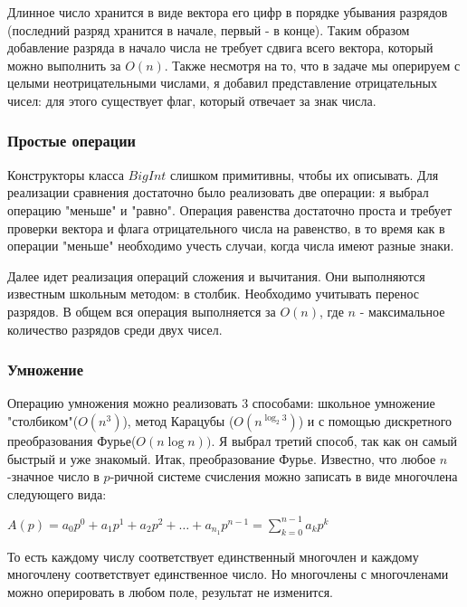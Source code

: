 \documentclass[12pt]{article}
\begin{document}
	Длинное число хранится в виде вектора его цифр в порядке убывания разрядов (последний разряд хранится в начале, первый - в конце). Таким образом добавление разряда в начало числа не требует сдвига всего вектора, который можно выполнить за $O(n)$. Также несмотря на то, что в задаче мы оперируем с целыми неотрицательными числами, я добавил представление отрицательных чисел: для этого существует флаг, который отвечает за знак числа.
	\subsubsection*{Простые операции}
	Конструкторы класса $BigInt$ слишком примитивны, чтобы их описывать.  Для реализации сравнения достаточно было реализовать две операции: я выбрал операцию "меньше" и "равно". Операция равенства достаточно проста и требует проверки вектора и флага отрицательного числа на равенство, в то время как в операции "меньше" необходимо учесть случаи, когда числа имеют разные знаки.
	
	Далее идет реализация операций сложения и вычитания. Они выполняются известным школьным методом: в столбик. Необходимо учитывать перенос разрядов. В общем вся операция выполняется за $O(n)$, где $n$ - максимальное количество разрядов среди двух чисел.
	
	\subsubsection*{Умножение}
	Операцию умножения можно реализовать 3 способами: школьное умножение "столбиком"($O(n^3)$), метод Карацубы ($O(n^{\log_2 3})$) и с помощью дискретного преобразования Фурье($O(n\log n))$. Я выбрал третий способ, так как он самый быстрый и уже знакомый. Итак, преобразование Фурье. Известно, что любое $n$-значное число в $p$-ричной системе счисления можно записать в виде многочлена следующего вида:
	
	\begin{center}
		$A(p) = a_0p^0 + a_1p^1 + a_2 p^2 + \ldots + a_{n_1} p^{n-1} = \displaystyle \sum_{k = 0}^{n-1} a_k  p^k$
	\end{center}

	То есть каждому числу соответствует единственный многочлен и каждому многочлену соответствует единственное число. Но многочлены с многочленами можно оперировать в любом поле, результат не изменится.
	
\end{document}
